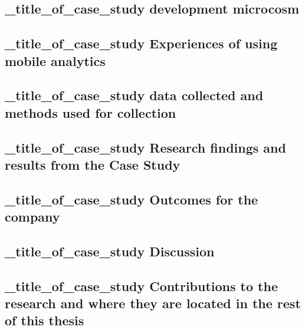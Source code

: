 \subsection{_title_of_case_study development microcosm}

\subsection{_title_of_case_study Experiences of using mobile analytics}

\subsection{_title_of_case_study data collected and methods used for collection}

\subsection{_title_of_case_study Research findings and results from the Case Study}

\subsection{_title_of_case_study Outcomes for the company}

\subsection{_title_of_case_study Discussion}

\subsection{_title_of_case_study Contributions to the research and where they are located in the rest of this thesis}
